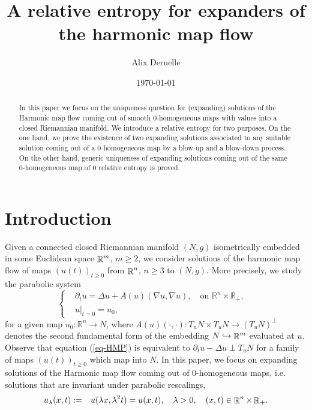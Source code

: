 \documentclass[a4paper,11pt,reqno]{amsart}
\def\R{\mathop{\rm \mathbb{R}}\nolimits}
\begin{document}
\title{A relative entropy for expanders of the harmonic map flow   }
\date{\today}
\begin{abstract}In this paper we focus on the uniqueness question for (expanding) solutions of the Harmonic map flow coming out of smooth $0$-homogeneous maps with values into a closed Riemannian manifold. We introduce a relative entropy for two purposes. On the one hand, we prove the existence of two expanding solutions associated to any suitable solution coming out of a $0$-homogeneous map by a blow-up and a blow-down process. On the other hand, generic uniqueness of expanding solutions coming out of the same $0$-homogeneous map of $0$ relative entropy is proved.
\end{abstract}

\author{Alix Deruelle}
\address[Alix Deruelle]{Institut de Math\'ematiques de Jussieu, Paris Rive Gauche (IMJ-PRG) UPMC - Campus Jussieu, 4, place Jussieu Bo\^ite Courrier 247 - 75252 Paris Cedex 05}

\maketitle


\section{Introduction}
Given a connected closed Riemannian manifold $(N,g)$ isometrically embedded in some Euclidean space $\R^m$, $m\geq 2$, we consider solutions of the harmonic map flow of maps $(u(t))_{t\geq 0}$ from $\R^n$, $n\geq 3$ to $(N,g)$. More precisely, we study the parabolic system
\begin{equation}
\left\{\begin{aligned}
&\partial_tu=\Delta u+A(u)(\nabla u,\nabla u),\quad\mbox{on $\mathbb{R}^n\times\mathbb{R}_+$},&\label{eq-HMP} \\
&u|_{t=0}=u_0,&
\end{aligned}
\right.
\end{equation}
for a given map $u_0:\mathbb{R}^n\rightarrow N$, where $A(u)(\cdot,\cdot):T_uN\times T_uN\rightarrow (T_uN)^{\perp}$ denotes the second fundamental form of the embedding $N \hookrightarrow \R^m$ evaluated at $u$. Observe that equation (\ref{eq-HMP}) is equivalent to $\partial_tu-\Delta u\perp T_uN$ for a family of maps $(u(t))_{t\geq0}$ which map into $N$.
In this paper, we focus on expanding solutions of the Harmonic map flow coming out of $0$-homogeneous maps, i.e. solutions that are invariant under parabolic rescalings,
\begin{eqnarray}
u_{\lambda}(x,t)&:=&u(\lambda x,\lambda^2t)=u(x,t), \quad \lambda>0,\quad \text{$(x,t)\in \R^n\times\R_+$}.\label{resc-cond}
\end{eqnarray}
 
\end{document}
